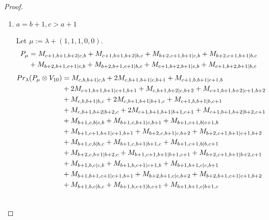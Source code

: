 \begin{proof}
\begin{enumerate}
\begin{enumerate}
      \item $a=b+1,c>a+1$\par
        Let $\mu:=\lambda + (1,1,1,0,0) $.
        \begin{equation}\notag
          \begin{aligned}
            P_\mu &= M_{c+1,b+1,b+2|c,b}
+ M_{c+1,b+1,b+2|b,c}
+ M_{b+2,c+1,b+1|c,b}
+ M_{b+2,c+1,b+1|b,c}\\
                                              &
+ M_{b+2,b+1,c+1|c,b}
+ M_{b+2,b+1,c+1|b,c}
+ M_{c+1,b+2,b+1|c,b}
+ M_{c+1,b+2,b+1|b,c}
          \end{aligned}
        \end{equation}
        \begin{equation}\notag
          \begin{aligned}
            Pr_{\lambda}(P_\mu \otimes V_{10}) &=
M_{c,b,b+1|c,b}
+ 2M_{c,b+1,b+1|c,b+1}
+ M_{c+1,b,b+1|c+1,b}\\
                                              &
+ 2M_{c+1,b+1,b+1|c+1,b+1}
+ M_{c,b+1,b+2|c,b+2}
+ M_{c+1,b+1,b+2|c+1,b+2}\\
                                              &
+ M_{c,b,b+1|b,c}
+ 2M_{c,b+1,b+1|b+1,c}
+ M_{c+1,b,b+1|b,c+1}\\
                                              &
+ M_{c,b+1,b+2|b+2,c}
+ 2M_{c+1,b+1,b+1|b+1,c+1}
+ M_{c+1,b+1,b+2|b+2,c+1}\\
                                              &
+ M_{b+1,c,b|c,b}
+ M_{b+1,c,b+1|c,b+1}
+ M_{b+1,c+1,b|c+1,b}\\
                                              &
+ M_{b+1,c+1,b+1|c+1,b+1}
+ M_{b+2,c,b+1|c,b+2}
+ M_{b+2,c+1,b+1|c+1,b+2}\\
                                              &
+ M_{b+1,c,b|b,c}
+ M_{b+1,c,b+1|b+1,c}
+ M_{b+1,c+1,b|b,c+1}\\
                                              &
+ M_{b+2,c,b+1|b+2,c}
+ M_{b+1,c+1,b+1|b+1,c+1}
+ M_{b+2,c+1,b+1|b+2,c+1}\\
                                              &
+ M_{b+1,b,c|c,b}
+ M_{b+1,b,c+1|c+1,b}
+ M_{b+1,b+1,c|c,b+1}\\
                                              &
+ M_{b+1,b+1,c+1|c+1,b+1}
+ M_{b+2,b+1,c|c,b+2}
+ M_{b+2,b+1,c+1|c+1,b+2}\\
                                              &
+ M_{b+1,b,c|b,c}
+ M_{b+1,b,c+1|b,c+1}
+ M_{b+1,b+1,c|b+1,c}\\
                                              &

\end{aligned}
\end{equation}
\end{enumerate}
\end{enumerate}
\end{proof}
